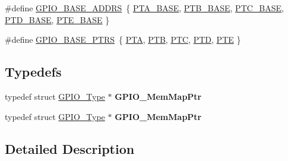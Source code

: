 \begin{DoxyCompactItemize}
\item 
\#define \hyperlink{group__GPIO__Peripheral__Access__Layer_ga7f97513de5235b3600dc07bf327fe315}{G\+P\+I\+O\+\_\+\+B\+A\+S\+E\+\_\+\+A\+D\+D\+RS}~\{ \hyperlink{group__GPIO__Peripheral__Access__Layer_ga6e3037b53880ddd4072d88ed493e6581}{P\+T\+A\+\_\+\+B\+A\+SE}, \hyperlink{group__GPIO__Peripheral__Access__Layer_ga8cd67de0ed62c0fe8395cc6e40af2451}{P\+T\+B\+\_\+\+B\+A\+SE}, \hyperlink{group__GPIO__Peripheral__Access__Layer_gafee763d072e472e36b335f8944b5de96}{P\+T\+C\+\_\+\+B\+A\+SE}, \hyperlink{group__GPIO__Peripheral__Access__Layer_gaa002f1a0c5f963f8d162916b91e21bf0}{P\+T\+D\+\_\+\+B\+A\+SE}, \hyperlink{group__GPIO__Peripheral__Access__Layer_gaac65442c7407ccb219eea68a45c2bdc6}{P\+T\+E\+\_\+\+B\+A\+SE} \}
\item 
\#define \hyperlink{group__GPIO__Peripheral__Access__Layer_gad0f7206167a584b1e75a81a5c30fa1c2}{G\+P\+I\+O\+\_\+\+B\+A\+S\+E\+\_\+\+P\+T\+RS}~\{ \hyperlink{group__GPIO__Peripheral__Access__Layer_ga953adcb40e14085a9ffd1aa0ae40084b}{P\+TA}, \hyperlink{group__GPIO__Peripheral__Access__Layer_gab245b794143f5d4aea6d1a5336b8b33e}{P\+TB}, \hyperlink{group__GPIO__Peripheral__Access__Layer_ga7deefa3e1c7e45e4ccb31a8117bc181f}{P\+TC}, \hyperlink{group__GPIO__Peripheral__Access__Layer_gacee2910b398755be94f612b243052efe}{P\+TD}, \hyperlink{group__GPIO__Peripheral__Access__Layer_ga074482d761e5bcd022a14aa7b8c294d7}{P\+TE} \}
\end{DoxyCompactItemize}
\subsection*{Typedefs}
\begin{DoxyCompactItemize}
\item 
typedef struct \hyperlink{structGPIO__Type}{G\+P\+I\+O\+\_\+\+Type} $\ast$ {\bfseries G\+P\+I\+O\+\_\+\+Mem\+Map\+Ptr}\hypertarget{group__GPIO__Peripheral__Access__Layer_ga9275f70cfdeadb6b6c69be29a471cb0b}{}\label{group__GPIO__Peripheral__Access__Layer_ga9275f70cfdeadb6b6c69be29a471cb0b}

\item 
typedef struct \hyperlink{structGPIO__Type}{G\+P\+I\+O\+\_\+\+Type} $\ast$ {\bfseries G\+P\+I\+O\+\_\+\+Mem\+Map\+Ptr}\hypertarget{group__GPIO__Peripheral__Access__Layer_ga9275f70cfdeadb6b6c69be29a471cb0b}{}\label{group__GPIO__Peripheral__Access__Layer_ga9275f70cfdeadb6b6c69be29a471cb0b}

\end{DoxyCompactItemize}


\subsection{Detailed Description}


